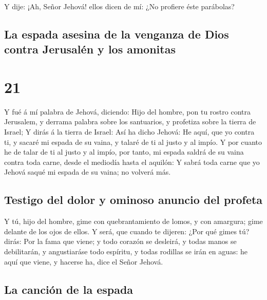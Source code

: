  Y dije: ¡Ah, Señor Jehová! ellos dicen de mí: ¿No profiere
éste parábolas?

\hypertarget{la-espada-asesina-de-la-venganza-de-dios-contra-jerusaluxe9n-y-los-amonitas}{%
\subsection{La espada asesina de la venganza de Dios contra Jerusalén y
los
amonitas}\label{la-espada-asesina-de-la-venganza-de-dios-contra-jerusaluxe9n-y-los-amonitas}}

\hypertarget{section-20}{%
\section{21}\label{section-20}}

 Y fué á mí palabra de Jehová, diciendo:  Hijo
del hombre, pon tu rostro contra Jerusalem, y derrama palabra sobre los
santuarios, y profetiza sobre la tierra de Israel;  Y dirás
á la tierra de Israel: Así ha dicho Jehová: He aquí, que yo contra ti, y
sacaré mi espada de su vaina, y talaré de ti al justo y al impío.
 Y por cuanto he de talar de ti al justo y al impío, por
tanto, mi espada saldrá de su vaina contra toda carne, desde el mediodía
hasta el aquilón:  Y sabrá toda carne que yo Jehová saqué mi
espada de su vaina; no volverá más.

\hypertarget{testigo-del-dolor-y-ominoso-anuncio-del-profeta}{%
\subsection{Testigo del dolor y ominoso anuncio del
profeta}\label{testigo-del-dolor-y-ominoso-anuncio-del-profeta}}

 Y tú, hijo del hombre, gime con quebrantamiento de lomos, y
con amargura; gime delante de los ojos de ellos.  Y será,
que cuando te dijeren: ¿Por qué gimes tú? dirás: Por la fama que viene;
y todo corazón se desleirá, y todas manos se debilitarán, y angustiaráse
todo espíritu, y todas rodillas se irán en aguas: he aquí que viene, y
hacerse ha, dice el Señor Jehová.

\hypertarget{la-canciuxf3n-de-la-espada}{%
\subsection{La canción de la espada}\label{la-canciuxf3n-de-la-espada}}

